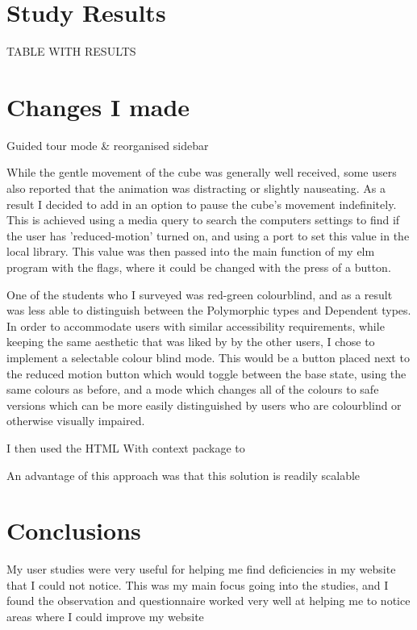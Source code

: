 \documentclass{l4proj}
\begin{document}
\section{Study Results}

TABLE WITH RESULTS

\section{Changes I made}

Guided tour mode \& reorganised sidebar

While the gentle movement of the cube was generally well received, some users also reported that the animation was distracting or slightly nauseating.  As a result I decided to add in an option to pause the cube's movement indefinitely.  This is achieved using a media query to search the computers settings to find if the user has 'reduced-motion' turned on, and using a port to set this value in the local library.  This value was then passed into the main function of my elm program with the flags, where it could be changed with the press of a button.

One of the students who I surveyed was red-green colourblind, and as a result was less able to distinguish between the Polymorphic types and Dependent types.  In order to accommodate users with similar accessibility requirements, while keeping the same aesthetic that was liked by by the other users, I chose to implement a selectable colour blind mode.  This would be a button placed next to the reduced motion button which would toggle between the base state, using the same colours as before, and a mode which changes all of the colours to safe versions which can be more easily distinguished by users who are colourblind or otherwise visually impaired.

I then used the HTML With context package to 

An advantage of this approach was that this solution is readily scalable

\section{Conclusions}

My user studies were very useful for helping me find deficiencies in my website that I could not notice.  This was my main focus going into the studies, and I found the observation and questionnaire worked very well at helping me to notice areas where I could improve my website
\end{document}
